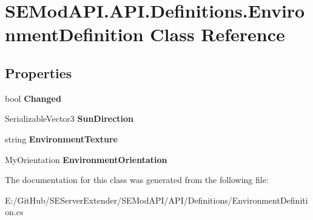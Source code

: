 \hypertarget{class_s_e_mod_a_p_i_1_1_a_p_i_1_1_definitions_1_1_environment_definition}{}\section{S\+E\+Mod\+A\+P\+I.\+A\+P\+I.\+Definitions.\+Environment\+Definition Class Reference}
\label{class_s_e_mod_a_p_i_1_1_a_p_i_1_1_definitions_1_1_environment_definition}
\subsection*{Properties}
\begin{DoxyCompactItemize}
\item 
\hypertarget{class_s_e_mod_a_p_i_1_1_a_p_i_1_1_definitions_1_1_environment_definition_af52fad7afb795bf55f03342cfdf7ed70}{}bool {\bfseries Changed}\label{class_s_e_mod_a_p_i_1_1_a_p_i_1_1_definitions_1_1_environment_definition_af52fad7afb795bf55f03342cfdf7ed70}

\item 
\hypertarget{class_s_e_mod_a_p_i_1_1_a_p_i_1_1_definitions_1_1_environment_definition_ab6d89680bb32b85ac7ffc8b686e8c37d}{}Serializable\+Vector3 {\bfseries Sun\+Direction}\label{class_s_e_mod_a_p_i_1_1_a_p_i_1_1_definitions_1_1_environment_definition_ab6d89680bb32b85ac7ffc8b686e8c37d}

\item 
\hypertarget{class_s_e_mod_a_p_i_1_1_a_p_i_1_1_definitions_1_1_environment_definition_ab0335d53c335be4b813d6b5eab6848c4}{}string {\bfseries Environment\+Texture}\label{class_s_e_mod_a_p_i_1_1_a_p_i_1_1_definitions_1_1_environment_definition_ab0335d53c335be4b813d6b5eab6848c4}

\item 
\hypertarget{class_s_e_mod_a_p_i_1_1_a_p_i_1_1_definitions_1_1_environment_definition_a77847839b3bde371243b491c2af97e3b}{}My\+Orientation {\bfseries Environment\+Orientation}\label{class_s_e_mod_a_p_i_1_1_a_p_i_1_1_definitions_1_1_environment_definition_a77847839b3bde371243b491c2af97e3b}

\end{DoxyCompactItemize}


The documentation for this class was generated from the following file\+:\begin{DoxyCompactItemize}
\item 
E\+:/\+Git\+Hub/\+S\+E\+Server\+Extender/\+S\+E\+Mod\+A\+P\+I/\+A\+P\+I/\+Definitions/Environment\+Definition.\+cs\end{DoxyCompactItemize}
